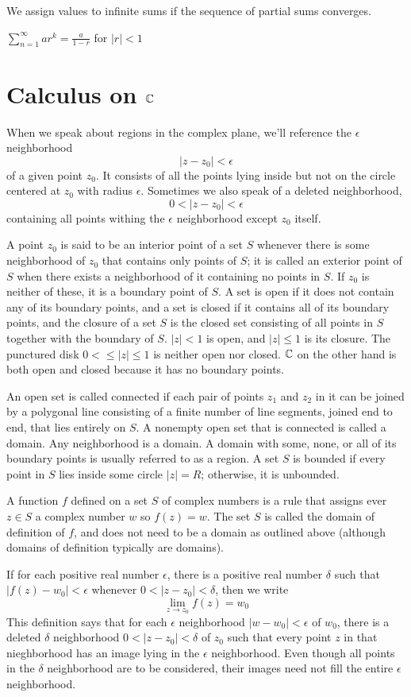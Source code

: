 We assign values to infinite sums if the sequence of partial sums converges.

$\displaystyle{\sum^{\infty}_{n=1} ar^{k} = \frac{a}{1-r}}$ for $|r| < 1$

\section{Calculus on $\mathbb{C}$}
When we speak about regions in the complex plane, we'll reference the $\epsilon$ neighborhood $$|z - z_0| < \epsilon$$ of a given point $z_0$. It consists of all the points lying inside but not on the circle centered at $z_0$ with radius $\epsilon$. Sometimes we also speak of a deleted neighborhood, $$0 < |z - z_0| < \epsilon$$ containing all points withing the $\epsilon$ neighborhood except $z_0$ itself.

A point $z_0$ is said to be an interior point of a set $S$ whenever there is some neighborhood of $z_0$ that contains only points of $S$; it is called an exterior point of $S$ when there exists a neighborhood of it containing no points in $S$. If $z_0$ is neither of these, it is a boundary point of $S$. A set is open if it does not contain any of its boundary points, and a set is closed if it contains all of its boundary points, and the closure of a set $S$ is the closed set consisting of all points in $S$ together with the boundary of $S$. $|z| < 1$ is open, and $|z| \leq 1$ is its closure. The punctured disk $0 < \leq |z| \leq 1$ is neither open nor closed. $\mathbb{C}$ on the other hand is both open and closed because it has no boundary points.

An open set is called connected if each pair of points $z_1$ and $z_2$ in it can be joined by a polygonal line consisting of a finite number of line segments, joined end to end, that lies entirely on $S$. A nonempty open set that is connected is called a domain. Any neighborhood is a domain. A domain with some, none, or all of its boundary points is usually referred to as a region. A set $S$ is bounded if every point in $S$ lies inside some circle $|z| = R$; otherwise, it is unbounded.

A function $f$ defined on a set $S$ of complex numbers is a rule that assigns ever $z \in S$ a complex number $w$ so $f(z) = w$. The set $S$ is called the domain of definition of $f$, and does not need to be a domain as outlined above (although domains of definition typically are domains).

If for each positive real number $\epsilon$, there is a positive real number $\delta$ such that $|f(z) - w_0| < \epsilon$ whenever $0 < |z - z_0| < \delta$, then we write $$\lim_{z \to z_0} f(z) = w_0$$ This definition says that for each $\epsilon$ neighborhood $|w - w_0| < \epsilon$ of $w_0$, there is a deleted $\delta$ neighborhood $0 < |z - z_0| < \delta$ of $z_0$ such that every point $z$ in that nieghborhood has an image lying in the $\epsilon$ neighborhood. Even though all points in the $\delta$ neighborhood are to be considered, their images need not fill the entire $\epsilon$ neighborhood.

